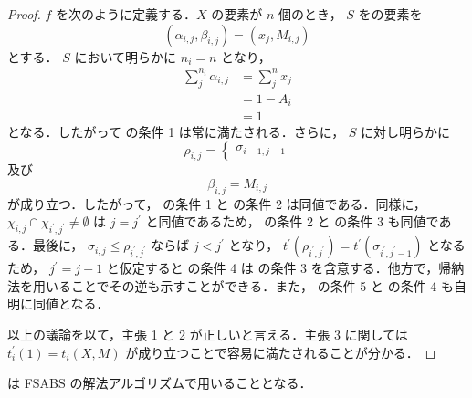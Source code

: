 \begin{proof}
  $f$ を次のように定義する．$X$ の要素が $n$ 個のとき， $S$ をの要素を
  \begin{equation}
    (\alpha_{i,j}, \beta_{i,j}) = (x_j, M_{i,j})
  \end{equation}
  とする． $S$ において明らかに $n_i = n$ となり，
  \begin{align}
    \sum_j^{n_i} \alpha_{i,j} &= \sum_j^n x_j \\
                              &= 1 - A_i \\
                              &= 1
  \end{align}
  となる．したがって  の条件 1 は常に満たされる．さらに， $S$ に対し明らかに
  \begin{equation}
    \rho_{i, j} = \begin{cases}
      \sigma_{i - 1, j - 1}
    \end{cases}
  \end{equation}
  及び
  \begin{equation}
    \beta_{i,j} = M_{i,j}
  \end{equation}
  が成り立つ．したがって， の条件 1 と  の条件 2 は同値である．同様に， $\chi_{i,j} \cap \chi_{i^\prime, j^\prime} \neq \emptyset$ は $j = j^\prime$ と同値であるため， の条件 2 と  の条件 3 も同値である．最後に， $\sigma_{i,j} \leq \rho_{i^\prime, j^\prime}$ ならば $j < j^\prime$ となり， $t^\prime(\rho_{i^\prime, j^\prime}) = t^\prime(\sigma_{i^\prime, j^\prime - 1})$ となるため， $j^\prime = j - 1$ と仮定すると  の条件 4 は  の条件 3 を含意する．他方で，帰納法を用いることでその逆も示すことができる．また，  の条件 5 と  の条件 4 も自明に同値となる．

  以上の議論を以て，主張 1 と 2 が正しいと言える．主張 3 に関しては $t^\prime_i(1) = t_i(X, M)$ が成り立つことで容易に満たされることが分かる．
\end{proof}
 は FSABS の解法アルゴリズムで用いることとなる．

